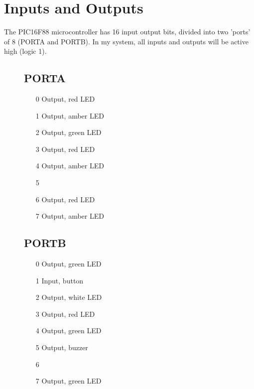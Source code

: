 \section{Inputs and Outputs}
The PIC16F88 microcontroller has 16 input output bits, divided into two 'ports' of 8 (PORTA and PORTB).
In my system, all inputs and outputs will be active high (logic 1).
\begin{figure}[H]
    \begin{minipage} {0.45\textwidth}
        \subsection{PORTA}
        \begin{itemize}
            \item[0] Output, red LED
            \item[1] Output, amber LED
            \item[2] Output, green LED
            \item[3] Output, red LED
            \item[4] Output, amber LED
            \item[5] 
            \item[6] Output, red LED
            \item[7] Output, amber LED
        \end{itemize}
    \end{minipage}\hfill
    \begin{minipage} {0.45\textwidth}
        \subsection{PORTB}
        \begin{itemize}
            \item[0] Output, green LED
            \item[1] Input, button
            \item[2] Output, white LED
            \item[3] Output, red LED
            \item[4] Output, green LED
            \item[5] Output, buzzer
            \item[6] 
            \item[7] Output, green LED
        \end{itemize}
    \end{minipage}
\end{figure}


